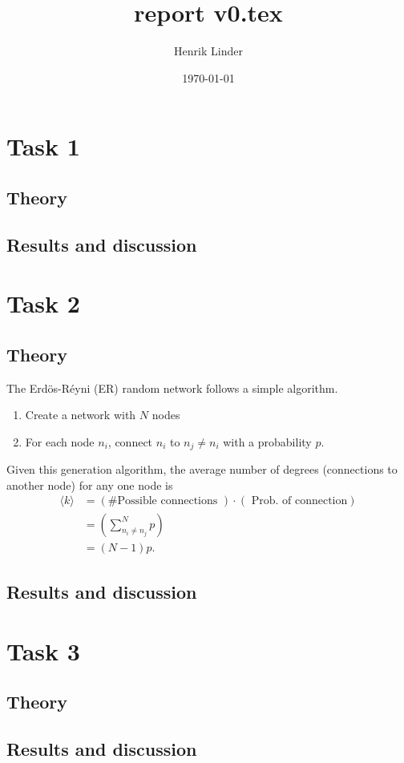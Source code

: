 \documentclass{article}
\title{report v0.tex }
\author{Henrik Linder}
\date{\today}
\begin{document}
\maketitle



\section{Task 1}
\subsection{Theory}
\subsection{Results and discussion}


\section{Task 2}
\subsection{Theory}
The Erdös-Réyni (ER) random network follows a simple algorithm. 
\begin{enumerate}
	\item Create a network with $N$ nodes 
	\item For each node $n_i$, connect $n_i$ to $n_j\neq n_i$ with a probability $p$.
\end{enumerate}

Given this generation algorithm, the average number of degrees (connections to another node) for any one node is 
\begin{equation}
	\begin{split}
	\langle k\rangle &= (\text{\#Possible connections })\cdot(\text{ Prob. of connection})\\
						 &=\left( \sum_{n_i\neq n_j}^N p \right)\\
						 &= (N-1)p.
	\end{split}
\end{equation}

\subsection{Results and discussion}




\section{Task 3}
\subsection{Theory}
\subsection{Results and discussion}
\end{document}
